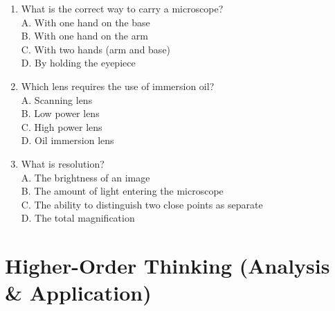 \documentclass[
  letterpaper,
  DIV=11,
  numbers=noendperiod]{scrreprt}
\begin{document}
\begin{enumerate}
\item
  What is the correct way to carry a microscope?\\
  A. With one hand on the base\\
  B. With one hand on the arm\\
  C. With two hands (arm and base)\\
  D. By holding the eyepiece
\item
  Which lens requires the use of immersion oil?\\
  A. Scanning lens\\
  B. Low power lens\\
  C. High power lens\\
  D. Oil immersion lens
\item
  What is resolution?\\
  A. The brightness of an image\\
  B. The amount of light entering the microscope\\
  C. The ability to distinguish two close points as separate\\
  D. The total magnification
\end{enumerate}

\section{\texorpdfstring{\textbf{Higher-Order Thinking (Analysis \&
Application)}}{Higher-Order Thinking (Analysis \& Application)}}\label{higher-order-thinking-analysis-application}
\end{document}
